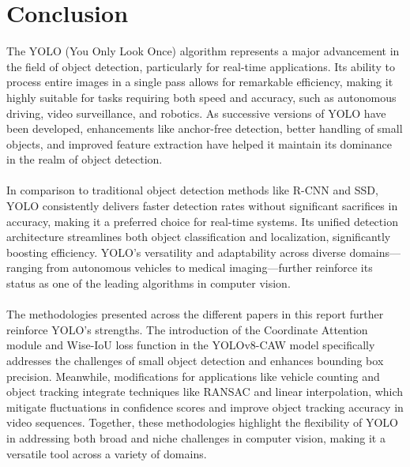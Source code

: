 \chapter{Conclusion}
%
The YOLO (You Only Look Once) algorithm represents a major advancement in the field of object detection, particularly for real-time applications. Its ability to process entire images in a single pass allows for remarkable efficiency, making it highly suitable for tasks requiring both speed and accuracy, such as autonomous driving, video surveillance, and robotics. As successive versions of YOLO have been developed, enhancements like anchor-free detection, better handling of small objects, and improved feature extraction have helped it maintain its dominance in the realm of object detection.\\\\
%
In comparison to traditional object detection methods like R-CNN and SSD, YOLO consistently delivers faster detection rates without significant sacrifices in accuracy, making it a preferred choice for real-time systems. Its unified detection architecture streamlines both object classification and localization, significantly boosting efficiency. YOLO’s versatility and adaptability across diverse domains—ranging from autonomous vehicles to medical imaging—further reinforce its status as one of the leading algorithms in computer vision.\\\\
%
The methodologies presented across the different papers in this report further reinforce YOLO’s strengths. The introduction of the Coordinate Attention module and Wise-IoU loss function in the YOLOv8-CAW model specifically addresses the challenges of small object detection and enhances bounding box precision. Meanwhile, modifications for applications like vehicle counting and object tracking integrate techniques like RANSAC and linear interpolation, which mitigate fluctuations in confidence scores and improve object tracking accuracy in video sequences. Together, these methodologies highlight the flexibility of YOLO in addressing both broad and niche challenges in computer vision, making it a versatile tool across a variety of domains.\\\\
